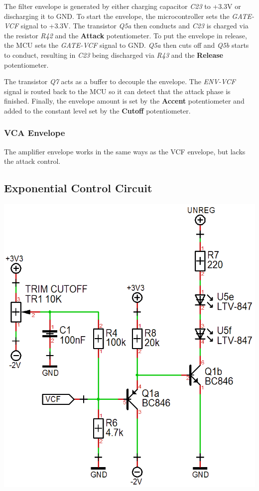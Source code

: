 \documentclass{scrartcl}
\begin{document}
The filter envelope is generated by either charging capacitor \emph{C23} to +3.3V or discharging it to GND. To start the envelope, the microcontroller sets the \emph{GATE-VCF} signal to +3.3V. The transistor \emph{Q5a} then conducts and \emph{C23} is charged via the resistor \emph{R42} and the \textbf{Attack} potentiometer. To put the envelope in release, the MCU sets the \emph{GATE-VCF} signal to GND. \emph{Q5a} then cuts off and \emph{Q5b} starts to conduct, resulting in \emph{C23} being discharged via \emph{R43} and the \textbf{Release} potentiometer.

The transistor \emph{Q7} acts as a buffer to decouple the envelope. The \emph{ENV-VCF} signal is routed back to the MCU so it can detect that the attack phase is finished. Finally, the envelope amount is set by the \textbf{Accent} potentiometer and added to the constant level set by the \textbf{Cutoff} potentiometer.

\subsubsection{VCA Envelope}

The amplifier envelope works in the same ways as the VCF envelope, but lacks the attack control.

\subsection{Exponential Control Circuit}

\begin{center}
    \includegraphics[scale=0.42]{assets/schema-expo.png}
\end{center}
\end{document}
